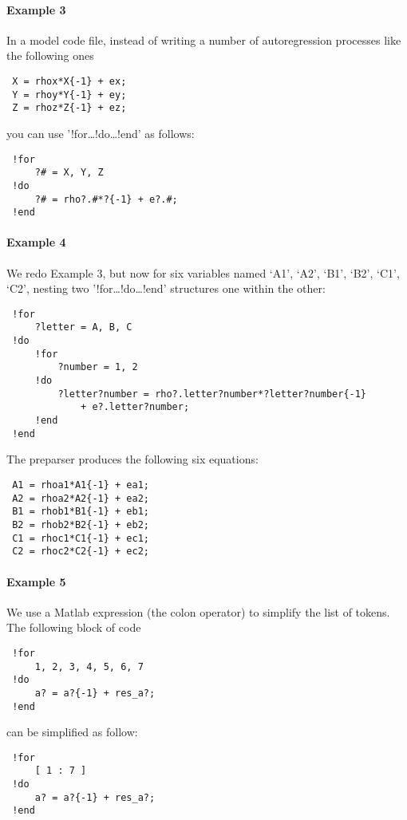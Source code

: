  \paragraph{Example 3}
 
 In a model code file, instead of writing a number of autoregression
 processes like the following ones
 
 \begin{verbatim}
 X = rhox*X{-1} + ex;
 Y = rhoy*Y{-1} + ey;
 Z = rhoz*Z{-1} + ez;
 \end{verbatim}
 
 you can use '!for\ldots{}!do\ldots{}!end' as follows:
 
 \begin{verbatim}
 !for
     ?# = X, Y, Z
 !do
     ?# = rho?.#*?{-1} + e?.#;
 !end
 \end{verbatim}
 
 \paragraph{Example 4}
 
 We redo Example 3, but now for six variables named `A1', `A2', `B1',
 `B2', `C1', `C2', nesting two '!for\ldots{}!do\ldots{}!end' structures
 one within the other:
 
 \begin{verbatim}
 !for
     ?letter = A, B, C
 !do
     !for
         ?number = 1, 2
     !do
         ?letter?number = rho?.letter?number*?letter?number{-1}
             + e?.letter?number;
     !end
 !end
 \end{verbatim}
 
 The preparser produces the following six equations:
 
 \begin{verbatim}
 A1 = rhoa1*A1{-1} + ea1;
 A2 = rhoa2*A2{-1} + ea2;
 B1 = rhob1*B1{-1} + eb1;
 B2 = rhob2*B2{-1} + eb2;
 C1 = rhoc1*C1{-1} + ec1;
 C2 = rhoc2*C2{-1} + ec2;
 \end{verbatim}
 
 \paragraph{Example 5}
 
 We use a Matlab expression (the colon operator) to simplify the list of
 tokens. The following block of code
 
 \begin{verbatim}
 !for
     1, 2, 3, 4, 5, 6, 7
 !do
     a? = a?{-1} + res_a?;
 !end
 \end{verbatim}
 
 can be simplified as follow:
 
 \begin{verbatim}
 !for
     [ 1 : 7 ]
 !do
     a? = a?{-1} + res_a?;
 !end
 \end{verbatim}


